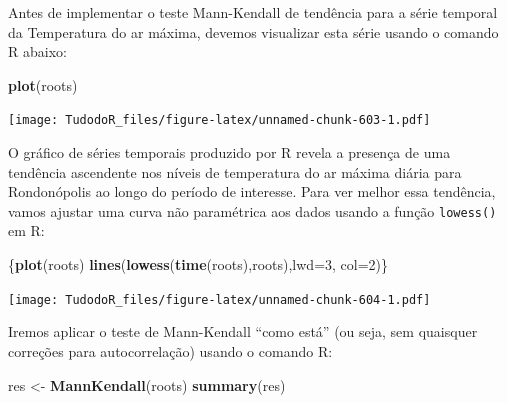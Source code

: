 \documentclass[
]{book}
\newenvironment{Shaded}{\begin{snugshade}}{\end{snugshade}}
\newcommand{\DataTypeTok}[1]{\textcolor[rgb]{0.13,0.29,0.53}{#1}}
\newcommand{\DecValTok}[1]{\textcolor[rgb]{0.00,0.00,0.81}{#1}}
\newcommand{\KeywordTok}[1]{\textcolor[rgb]{0.13,0.29,0.53}{\textbf{#1}}}
\newcommand{\NormalTok}[1]{#1}
\newcommand{\OperatorTok}[1]{\textcolor[rgb]{0.81,0.36,0.00}{\textbf{#1}}}
\newcommand{\StringTok}[1]{\textcolor[rgb]{0.31,0.60,0.02}{#1}}
\begin{document}
\begin{Shaded}
\end{Shaded}

Antes de implementar o teste Mann-Kendall de tendência para a série temporal da Temperatura do ar máxima, devemos visualizar esta série usando o comando R abaixo:

\begin{Shaded}
\begin{Highlighting}[]
\KeywordTok{plot}\NormalTok{(roots)}
\end{Highlighting}
\end{Shaded}

\texttt{[image: TudodoR\_files/figure-latex/unnamed-chunk-603-1.pdf]}

O gráfico de séries temporais produzido por R revela a presença de uma tendência ascendente nos níveis de temperatura do ar máxima diária para Rondonópolis ao longo do período de interesse. Para ver melhor essa tendência, vamos ajustar uma curva não paramétrica aos dados usando a função \texttt{lowess()} em R:

\begin{Shaded}
\begin{Highlighting}[]
\NormalTok{\{}\KeywordTok{plot}\NormalTok{(roots)}
\KeywordTok{lines}\NormalTok{(}\KeywordTok{lowess}\NormalTok{(}\KeywordTok{time}\NormalTok{(roots),roots),}\DataTypeTok{lwd=}\DecValTok{3}\NormalTok{, }\DataTypeTok{col=}\DecValTok{2}\NormalTok{)\}}
\end{Highlighting}
\end{Shaded}

\texttt{[image: TudodoR\_files/figure-latex/unnamed-chunk-604-1.pdf]}

Iremos aplicar o teste de Mann-Kendall ``como está'' (ou seja, sem quaisquer correções para autocorrelação) usando o comando R:

\begin{Shaded}
\begin{Highlighting}[]
\NormalTok{res <-}\StringTok{ }\KeywordTok{MannKendall}\NormalTok{(roots)}
\KeywordTok{summary}\NormalTok{(res)}
\end{Highlighting}
\end{Shaded}
\end{document}
